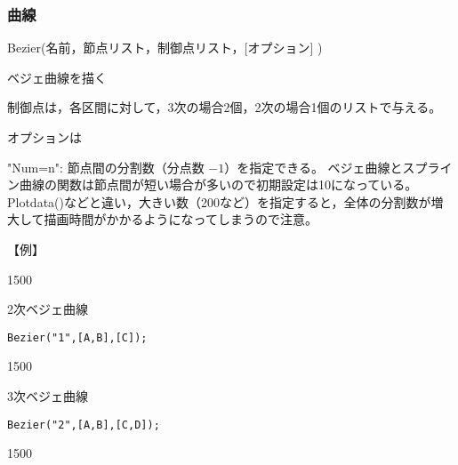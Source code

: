 \documentclass[papersize,a4paper,10pt,uplatex]{jsarticle}
\begin{document}
\subsubsection{曲線}
\begin{description}

\hypertarget{bezier}{}
\item[関数]Bezier(名前，節点リスト，制御点リスト，[オプション] )
\item[機能]ベジェ曲線を描く
\item[説明]制御点は，各区間に対して，3次の場合2個，2次の場合1個のリストで与える。

オプションは

"Num=n": 節点間の分割数（分点数 $-1$）を指定できる。 ベジェ曲線とスプライン曲線の関数は節点間が短い場合が多いので初期設定は10になっている。Plotdata()などと違い，大きい数（200など）を指定すると，全体の分割数が増大して描画時間がかかるようになってしまうので注意。

\vspace{\baselineskip}
【例】

\begin{layer}{150}{0}
\end{layer}

2次ベジェ曲線

\verb|Bezier("1",[A,B],[C]);|

\vspace{10mm}

\begin{layer}{150}{0}
\end{layer}

3次ベジェ曲線

\verb|Bezier("2",[A,B],[C,D]);|

\vspace{15mm}

\begin{layer}{150}{0}
\end{layer}






\end{description}
\end{document}
